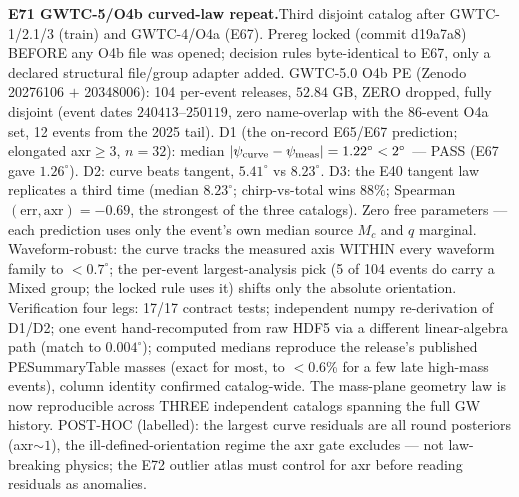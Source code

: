 \documentclass[10pt]{article}
\newcommand{\entry}[2]{\vspace{5pt}\noindent\textbf{#1}\quad #2\par}
\begin{document}
\entry{E71 GWTC-5/O4b curved-law repeat.}{Third disjoint catalog after GWTC-1/2.1/3 (train) and
GWTC-4/O4a (E67). Prereg locked (commit d19a7a8) BEFORE any O4b file was opened; decision rules
byte-identical to E67, only a declared structural file/group adapter added. GWTC-5.0 O4b PE (Zenodo
20276106 $+$ 20348006): 104 per-event releases, $52.84$ GB, ZERO dropped, fully disjoint (event dates
$240413$--$250119$, zero name-overlap with the 86-event O4a set, 12 events from the 2025 tail). D1
(the on-record E65/E67 prediction; elongated axr$\ge3$, $n=32$): median $|\psi_{\rm curve}-\psi_{\rm
meas}| = 1.22^\circ < 2^\circ$ --- PASS (E67 gave $1.26^\circ$). D2: curve beats tangent, $5.41^\circ$
vs $8.23^\circ$. D3: the E40 tangent law replicates a third time (median $8.23^\circ$; chirp-vs-total
wins $88$\%; Spearman$(\mathrm{err},\mathrm{axr})=-0.69$, the strongest of the three catalogs). Zero
free parameters --- each prediction uses only the event's own median source $M_c$ and $q$ marginal.
Waveform-robust: the curve tracks the measured axis WITHIN every waveform family to $<0.7^\circ$; the
per-event largest-analysis pick (5 of 104 events do carry a Mixed group; the locked rule uses it)
shifts only the absolute orientation. Verification four legs: 17/17 contract tests; independent numpy
re-derivation of D1/D2; one event hand-recomputed from raw HDF5 via a different linear-algebra path
(match to $0.004^\circ$); computed medians reproduce the release's published PESummaryTable masses
(exact for most, to $<0.6$\% for a few late high-mass events), column identity confirmed catalog-wide.
The mass-plane geometry law is now reproducible across THREE independent catalogs spanning the full GW
history. POST-HOC (labelled): the largest curve residuals are all round posteriors (axr$\sim1$), the
ill-defined-orientation regime the axr gate excludes --- not law-breaking physics; the E72 outlier
atlas must control for axr before reading residuals as anomalies.}
\end{document}
